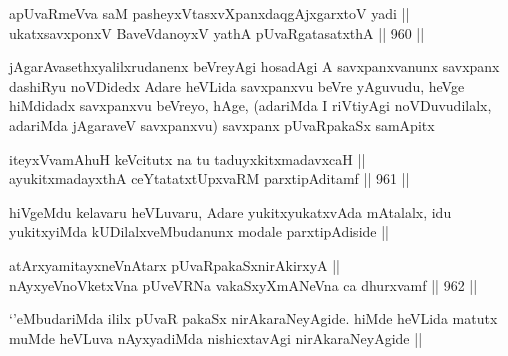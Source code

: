 \begin{shl}
apUvaRmeVva saM pasheyxVtasxvXpanxdaqgAjxgarxtoV yadi || \\
ukatxsavxponxV BaveVdanoyxV yathA pUvaRgatasatxthA ||  960 ||  
\end{shl}

\begin{artha}
jAgarAvasethxyalilxrudanenx beVreyAgi hosadAgi A savxpanxvanunx savxpanx dashiRyu noVDidedx Adare heVLida savxpanxvu beVre yAguvudu, heVge hiMdidadx savxpanxvu beVreyo, hAge, (adariMda I riVtiyAgi noVDuvudilalx, adariMda jAgaraveV savxpanxvu) savxpanx pUvaRpakaSx samApitx
\end{artha}

\begin{shl}
iteyxVvamAhuH keVcitutx na tu taduyxkitxmadavxcaH ||  \\
ayukitxmadayxthA ceYtatatxtUpxvaRM parxtipAditamf ||  961 ||  
\end{shl}

\begin{artha}
hiVgeMdu kelavaru heVLuvaru, Adare yukitxyukatxvAda mAtalalx, idu yukitxyiMda kUDilalxveMbudanunx modale parxtipAdiside ||
\end{artha}


\begin{shl}
atArxyamitayxneVnAtarx pUvaRpakaSxnirAkirxyA || \\
nAyxyeVnoVketxVna pUveVRNa vakaSxyXmANeVna ca dhurxvamf ||  962 ||  
\end{shl}

\begin{artha}
`\stext'eMbudariMda ililx pUvaR pakaSx nirAkaraNeyAgide. hiMde heVLida matutx muMde heVLuva nAyxyadiMda nishicxtavAgi nirAkaraNeyAgide ||
\end{artha}
